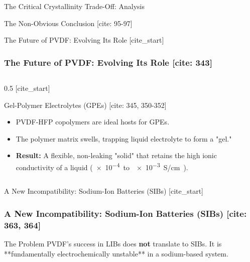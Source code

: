 \documentclass[aspectratio=169]{beamer}
\begin{document}
\begin{frame}{The Critical Crystallinity Trade-Off: Analysis}
\begin{alertblock}{The Non-Obvious Conclusion [cite: 95-97]}
\begin{frame}{The Future of PVDF: Evolving Its Role}
    [cite_start]\frametitle{The Future of PVDF: Evolving Its Role [cite: 343]}
    
    \begin{columns}[T]
        \begin{column}{0.5\textwidth}
            [cite_start]\begin{block}{Gel-Polymer Electrolytes (GPEs) [cite: 345, 350-352]}
                \begin{itemize}
                    \item PVDF-HFP copolymers are ideal hosts for GPEs.
                    \item The polymer matrix swells, trapping liquid electrolyte to form a "gel."
                    \item \textbf{Result:} A flexible, non-leaking "solid" that retains the high ionic conductivity of a liquid (\SI{e-4} to \SI{e-3}{S/cm}).
                \end{itemize}
            \end{block}
        \end{column}
        
    \end{columns}
\end{frame}

\begin{frame}{A New Incompatibility: Sodium-Ion Batteries (SIBs)}
    [cite_start]\frametitle{A New Incompatibility: Sodium-Ion Batteries (SIBs) [cite: 363, 364]}
    
    \begin{block}{The Problem}
        PVDF's success in LIBs does \textbf{not} translate to SIBs. It is **fundamentally electrochemically unstable** in a sodium-based system.
    \end{block}
    

\end{frame}
\end{alertblock}
\end{frame}
\end{document}
